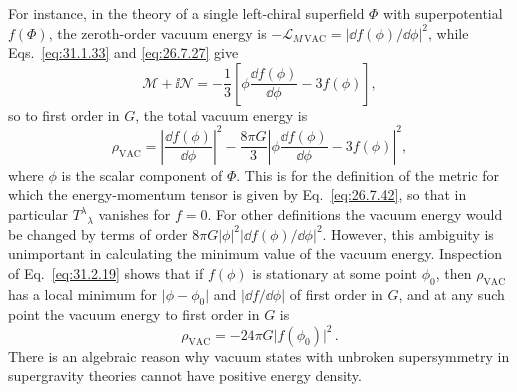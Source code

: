 For instance, in the theory of a single left-chiral superfield \(\Phi\) with
superpotential \(f(\Phi)\), the zeroth-order vacuum energy is
\(-\mathcal L_{M\,\mathrm{VAC}}=\lvert \dd f(\phi)/\dd\phi\rvert^2\), while
Eqs.~\eqref{eq:31.1.33} and \eqref{eq:26.7.27} give
\[
  \mathcal M+\ii\mathcal N
  =-\frac13\left[
    \phi\frac{\dd f(\phi)}{\dd\phi}-3f(\phi)
  \right],
\]
so to first order in \(G\), the total vacuum energy is
\begin{equation}
  \rho_{\mathrm{VAC}}
  =\left\lvert\frac{\dd f(\phi)}{\dd\phi}\right\rvert^2
   -\frac{8\pi G}{3}
    \left\lvert
      \phi\frac{\dd f(\phi)}{\dd\phi}-3f(\phi)
    \right\rvert^2,
  \tag{31.2.19}\label{eq:31.2.19}
\end{equation}
where \(\phi\) is the scalar component of \(\Phi\). This is for the definition
of the metric for which the energy-momentum tensor is given by
Eq.~\eqref{eq:26.7.42}, so that in particular \(T^\lambda{}_\lambda\)
vanishes for \(f=0\). For other definitions the vacuum energy would be
changed by terms of order
\(8\pi G\lvert\phi\rvert^2\lvert \dd f(\phi)/\dd\phi\rvert^2\). However, this
ambiguity is unimportant in calculating the minimum value of the vacuum
energy. Inspection of Eq.~\eqref{eq:31.2.19} shows that if \(f(\phi)\) is
stationary at some point \(\phi_0\), then \(\rho_{\mathrm{VAC}}\) has a local
minimum for \(\lvert\phi-\phi_0\rvert\) and \(\lvert \dd f/\dd\phi\rvert\) of first
order in \(G\), and at any such point the vacuum energy to first order in
\(G\) is
\begin{equation}
  \rho_{\mathrm{VAC}}=-24\pi G\lvert f(\phi_0)\rvert^2\,.
  \tag{31.2.20}\label{eq:31.2.20}
\end{equation}
There is an algebraic reason why vacuum states with unbroken supersymmetry in
supergravity theories cannot have positive energy density.

